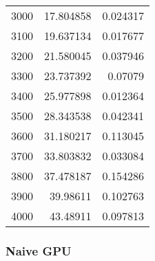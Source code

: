 \begin{longtable}{r r r}
3000 & 17.804858 & 0.024317 \\
3100 & 19.637134 & 0.017677 \\
3200 & 21.580045 & 0.037946 \\
3300 & 23.737392 & 0.07079 \\
3400 & 25.977898 & 0.012364 \\
3500 & 28.343538 & 0.042341 \\
3600 & 31.180217 & 0.113045 \\
3700 & 33.803832 & 0.033084 \\
3800 & 37.478187 & 0.154286 \\
3900 & 39.98611 & 0.102763 \\
4000 & 43.48911 & 0.097813 \\
\end{longtable}

\subsubsection{Naive GPU}

